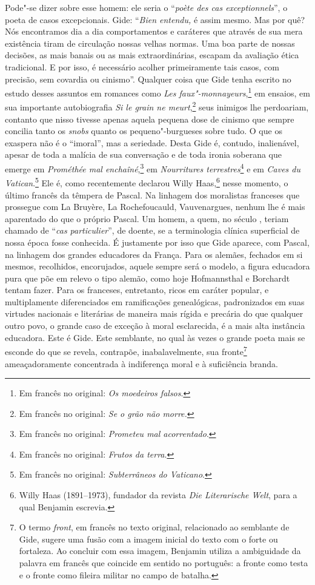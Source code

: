 Pode"-se dizer sobre esse homem: ele seria o ``\emph{poète des cas
exceptionnels}'', o poeta de casos excepcionais. Gide: ``\emph{Bien
entendu,} é assim mesmo. Mas por quê? Nós encontramos dia a dia
comportamentos e caráteres que através de sua mera existência tiram de
circulação nossas velhas normas. Uma boa parte de nossas decisões, as
mais banais ou as mais extraordinárias, escapam da avaliação ética
tradicional. E por isso, é necessário acolher primeiramente tais casos,
com precisão, sem covardia ou cinismo''. Qualquer coisa que Gide tenha
escrito no estudo desses assuntos em romances como \emph{Les
faux"-monnayeurs},\footnote{Em francês no original: \emph{Os moedeiros falsos}. \versal{[N.~T.]}}
em ensaios, em sua importante autobiografia \emph{Si le grain ne meurt},\footnote{Em francês no original: \emph{Se o grão não morre.} \versal{[N.~T.]}} seus inimigos lhe
perdoariam, contanto que nisso tivesse apenas aquela pequena dose de
cinismo que sempre concilia tanto os \emph{snobs} quanto os
pequeno"-burgueses sobre tudo. O que os exaspera não é o ``imoral'', mas a
seriedade. Desta Gide é, contudo, inalienável, apesar de toda a malícia
de sua conversação e de toda ironia soberana que emerge em
\emph{Prométhée mal enchaîné},\footnote{Em francês no original: \emph{Prometeu mal
  acorrentado}. \versal{[N.~T.]}} em \emph{Nourritures terrestres}\footnote{Em francês no original: \emph{Frutos da terra}. \versal{[N.~T.]}} e em \emph{Caves du Vatican}.\footnote{Em francês no original: \emph{Subterrâneos do Vaticano}. \versal{[N.~T.]}} Ele é, como recentemente declarou Willy Haas,\footnote{Willy Haas (1891--1973), fundador da revista \emph{Die
  Literarische Welt}, para a qual Benjamin escrevia. \versal{[N.~O.]}} nesse momento, o
último francês da têmpera de Pascal. Na linhagem dos moralistas
franceses que prossegue com La Bruyère, La Rochefoucauld, Vauvenargues,
nenhum lhe é mais aparentado do que o próprio Pascal. Um homem, a quem,
no século , teriam chamado de ``\emph{cas particulier}'', de doente,
se a terminologia clínica superficial de nossa época fosse conhecida. É
justamente por isso que Gide aparece, com Pascal, na linhagem dos
grandes educadores da França. Para os alemães, fechados em si mesmos,
recolhidos, encorujados, aquele sempre será o modelo, a figura educadora
pura que põe em relevo o tipo alemão, como hoje Hofmannsthal e Borchardt
tentam fazer. Para os franceses, entretanto, ricos em caráter popular,
e multiplamente diferenciados em ramificações genealógicas, padronizados
em suas virtudes nacionais e literárias de maneira mais rígida e
precária do que qualquer outro povo, o grande caso de exceção à moral
esclarecida, é a mais alta instância educadora. Este é Gide. Este
semblante, no qual às vezes o grande poeta mais se esconde do que se
revela, contrapõe, inabalavelmente, sua fronte\footnote{O termo
  \emph{front}, em francês no texto original, relacionado ao semblante de
  Gide, sugere uma fusão com a imagem inicial do texto com o forte ou
  fortaleza. Ao concluir com essa imagem, Benjamin utiliza a ambiguidade
  da palavra em francês que coincide em sentido no português: a fronte
  como testa e o fronte como fileira militar no campo de batalha. \versal{[N.~T.]}}
ameaçadoramente concentrada à indiferença moral e à suficiência branda.

